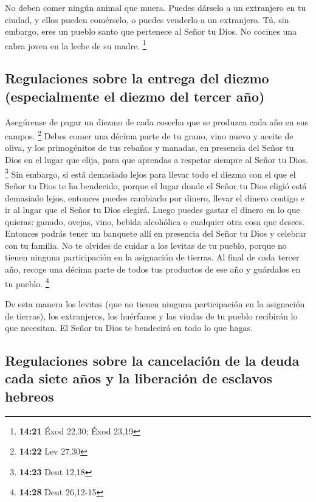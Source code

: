  No deben comer ningún animal que muera. Puedes dárselo a
un extranjero en tu ciudad, y ellos pueden comérselo, o puedes venderlo
a un extranjero. Tú, sin embargo, eres un pueblo santo que pertenece al
Señor tu Dios. No cocines una cabra joven en la leche de su madre.
\footnote{\textbf{14:21} Éxod 22,30; Éxod 23,19}

\hypertarget{regulaciones-sobre-la-entrega-del-diezmo-especialmente-el-diezmo-del-tercer-auxf1o}{%
\subsection{Regulaciones sobre la entrega del diezmo (especialmente el
diezmo del tercer
año)}\label{regulaciones-sobre-la-entrega-del-diezmo-especialmente-el-diezmo-del-tercer-auxf1o}}

 Asegúrense de pagar un diezmo de cada cosecha que se
produzca cada año en sus campos. \footnote{\textbf{14:22} Lev 27,30}
 Debes comer una décima parte de tu grano, vino nuevo y
aceite de oliva, y los primogénitos de tus rebaños y manadas, en
presencia del Señor tu Dios en el lugar que elija, para que aprendas a
respetar siempre al Señor tu Dios. \footnote{\textbf{14:23} Deut 12,18}
 Sin embargo, si está demasiado lejos para llevar todo el
diezmo con el que el Señor tu Dios te ha bendecido, porque el lugar
donde el Señor tu Dios eligió está demasiado lejos, 
entonces puedes cambiarlo por dinero, llevar el dinero contigo e ir al
lugar que el Señor tu Dios elegirá.  Luego puedes gastar
el dinero en lo que quieras: ganado, ovejas, vino, bebida alcohólica o
cualquier otra cosa que desees. Entonces podrás tener un banquete allí
en presencia del Señor tu Dios y celebrar con tu familia.
 No te olvides de cuidar a los levitas de tu pueblo,
porque no tienen ninguna participación en la asignación de tierras.
 Al final de cada tercer año, recoge una décima parte de
todos tus productos de ese año y guárdalos en tu pueblo. \footnote{\textbf{14:28}
  Deut 26,12-15}

 De esta manera los levitas (que no tienen ninguna
participación en la asignación de tierras), los extranjeros, los
huérfanos y las viudas de tu pueblo recibirán lo que necesitan. El Señor
tu Dios te bendecirá en todo lo que hagas.

\hypertarget{regulaciones-sobre-la-cancelaciuxf3n-de-la-deuda-cada-siete-auxf1os-y-la-liberaciuxf3n-de-esclavos-hebreos}{%
\subsection{Regulaciones sobre la cancelación de la deuda cada siete
años y la liberación de esclavos
hebreos}\label{regulaciones-sobre-la-cancelaciuxf3n-de-la-deuda-cada-siete-auxf1os-y-la-liberaciuxf3n-de-esclavos-hebreos}}

